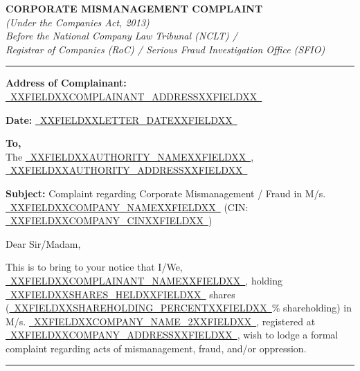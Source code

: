 \documentclass[12pt,a4paper]{article}
\newcommand{\fillline}[1]{\underline{~#1~}}
\begin{document}
\begin{center}
    {\LARGE\textbf{CORPORATE MISMANAGEMENT COMPLAINT}}\\[0.5em]
    {\normalsize\textit{(Under the Companies Act, 2013)}}\\[0.3em]
    {\normalsize\textit{Before the National Company Law Tribunal (NCLT) /}}\\
    {\normalsize\textit{Registrar of Companies (RoC) / Serious Fraud Investigation Office (SFIO)}}\\[0.5em]
    \rule{\linewidth}{0.4pt}
\end{center}

\vspace{0.5em}

\noindent\textbf{Address of Complainant:}\\
\fillline{XXFIELDXXCOMPLAINANT_ADDRESSXXFIELDXX}

\vspace{1em}

\noindent\textbf{Date:} \fillline{XXFIELDXXLETTER_DATEXXFIELDXX}

\vspace{1em}

\noindent\textbf{To,}\\
The \fillline{XXFIELDXXAUTHORITY_NAMEXXFIELDXX},\\
\fillline{XXFIELDXXAUTHORITY_ADDRESSXXFIELDXX}

\vspace{1em}

\noindent\textbf{Subject:} Complaint regarding Corporate Mismanagement / Fraud in
M/s. \fillline{XXFIELDXXCOMPANY_NAMEXXFIELDXX} (CIN: \fillline{XXFIELDXXCOMPANY_CINXXFIELDXX})

\vspace{1em}

\noindent Dear Sir/Madam,

\vspace{0.5em}

\noindent This is to bring to your notice that I/We, \fillline{XXFIELDXXCOMPLAINANT_NAMEXXFIELDXX},
holding \fillline{XXFIELDXXSHARES_HELDXXFIELDXX} shares (\fillline{XXFIELDXXSHAREHOLDING_PERCENTXXFIELDXX}\% shareholding)
in M/s. \fillline{XXFIELDXXCOMPANY_NAME_2XXFIELDXX}, registered at \fillline{XXFIELDXXCOMPANY_ADDRESSXXFIELDXX},
wish to lodge a formal complaint regarding acts of mismanagement, fraud, and/or oppression.

\vspace{1em}
\rule{\linewidth}{0.4pt}
\end{document}
